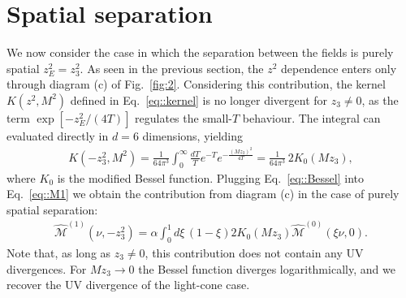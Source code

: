 \section{Spatial separation}
\label{sec:spatial-separtaion}

We now consider the case in which the separation between the fields is purely
spatial $z_E^2 = z_3^2$. As seen in the previous section, the $z^2$ dependence
enters only through diagram (c) of Fig.~\ref{fig:2}. Considering this
contribution, the kernel $K\left(z^2,M^2\right) $ defined in
Eq.~\eqref{eq::kernel} is no longer divergent for $z_3\neq 0$, as the term
$\exp\left[-z_E^2/(4T)\right]$ regulates the small-$T$ behaviour. The integral
can evaluated directly in $d=6$ dimensions, yielding
\begin{align}
    \label{eq::Bessel}
    K\left(-z_3^2, M^2\right) = 
    \frac{1}{64\pi^3}\int_0^{\infty}\frac{dT}{T} e^{-T} e^{-\frac{\left(M z_3\right)^2}{4T}} =\frac{1}{64\pi^3}\, 2K_0\left(M z_3\right),
\end{align}
where $K_0$ is the modified Bessel function. Plugging Eq.~\eqref{eq::Bessel} into Eq.~\eqref{eq::M1} we obtain the contribution from diagram (c) in the case of purely spatial separation:
\begin{align}
\label{eq::1loopcont}
    \widehat{\mathcal{M}}^{(1)}\left(\nu, -z_3^2\right) = 
    \alpha\int_0^{1} d\xi \, \left(1-\xi\right) 2K_0\left(M z_3\right)\widehat{\mathcal{M}}^{(0)}\left(\xi\nu, 0\right) .
\end{align}
Note that, as long as $z_3 \neq 0$, this contribution does not contain any UV
divergences. For $M z_3 \rightarrow 0$ the Bessel function diverges
logarithmically, and we recover the UV divergence of the light-cone case.

